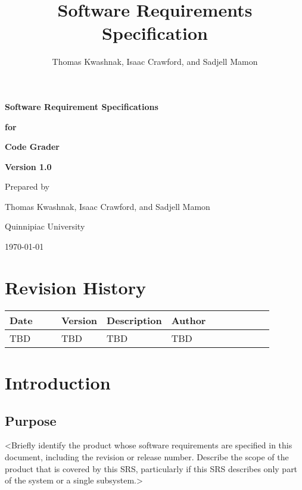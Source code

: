 \documentclass{article}
\title{Software Requirements Specification}
\author{Thomas Kwashnak, Isaac Crawford, and Sadjell Mamon}
\begin{document}

\begin{titlepage}
  \vspace*{1cm}

  \Huge
  \textbf{Software Requirement Specifications}

  \vspace{0.5cm}

  \textbf{for}

  \vspace{0.5cm}

  \textbf{Code Grader}

  \vspace{2cm}

  \LARGE
  \textbf{Version 1.0}

  \vspace{3cm}

  Prepared by

  Thomas Kwashnak, Isaac Crawford, and Sadjell Mamon

  \vspace{0.75cm}
  Quinnipiac University

  \vspace{7cm}

  \today
\end{titlepage}

\section*{Revision History}

\begin{tabular}{| p{0.2\linewidth} | p{0.075\linewidth} | p{0.2\linewidth} | p{0.4\linewidth} |}
  \hline
  Date & Version & Description & Author\\
  \hline
  \hline
  TBD & TBD & TBD & TBD \\
  \hline

\end{tabular}

\newpage

\tableofcontents

\newpage

\section{Introduction}

\subsection{Purpose}
<Briefly identify the product whose software requirements are specified in this document, including the revision or release number. Describe the scope of the product that is covered by this SRS, particularly if this SRS describes only part of the system or a single subsystem.>
\end{document}
